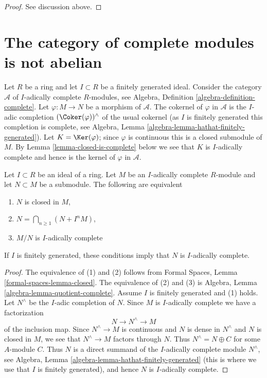 \begin{proof}
See discussion above.
\end{proof}



\section{The category of complete modules is not abelian}
\label{section-non-abelian}

\noindent
Let $R$ be a ring and let $I \subset R$ be a finitely generated ideal.
Consider the category $\mathcal{A}$ of $I$-adically complete
$R$-modules, see
Algebra, Definition \ref{algebra-definition-complete}.
Let $\varphi : M \to N$ be a morphism of $\mathcal{A}$.
The cokernel of $\varphi$ in $\mathcal{A}$ is the $I$-adic completion
$(\Coker(\varphi))^\wedge$ of the usual cokernel
(as $I$ is finitely generated this completion is complete, see
Algebra, Lemma \ref{algebra-lemma-hathat-finitely-generated}).
Let $K = \Ker(\varphi)$; since $\varphi$ is continuous this
is a closed submodule of $M$. By Lemma \ref{lemma-closed-is-complete}
below we see that $K$ is $I$-adically complete and hence is the
kernel of $\varphi$ in $\mathcal{A}$.

\begin{lemma}
\label{lemma-closed-is-complete}
Let $I \subset R$ be an ideal of a ring. Let $M$ be an $I$-adically complete
$R$-module and let $N \subset M$ be a submodule. The following are equivalent
\begin{enumerate}
\item $N$ is closed in $M$,
\item $N = \bigcap_{n \geq 1} (N + I^n M)$,
\item $M/N$ is $I$-adically complete
\end{enumerate}
If $I$ is finitely generated, these conditions imply that $N$
is $I$-adically complete.
\end{lemma}

\begin{proof}
The equivalence of (1) and (2) follows from
Formal Spaces, Lemma \ref{formal-spaces-lemma-closed}.
The equivalence of (2) and (3) is
Algebra, Lemma \ref{algebra-lemma-quotient-complete}.
Assume $I$ is finitely generated and (1) holds.
Let $N^\wedge$ be the $I$-adic completion of $N$. Since $M$
is $I$-adically complete we have a factorization
$$
N \to N^\wedge \to M
$$
of the inclusion map. Since $N^\wedge \to M$ is continuous and
$N$ is dense in $N^\wedge$ and $N$ is closed in $M$, we see that
$N^\wedge \to M$ factors through $N$. Thus $N^\wedge = N \oplus C$
for some $A$-module $C$. Thus $N$ is a direct summand of the
$I$-adically complete module $N^\wedge$, see
Algebra, Lemma \ref{algebra-lemma-hathat-finitely-generated}
(this is where we use that $I$ is finitely generated),
and hence $N$ is $I$-adically complete.
\end{proof}

